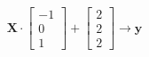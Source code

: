 \documentclass[10pt]{article}
\begin{document}
\begin{align*}\boldsymbol{X} \cdot
\begin{bmatrix}
-1 \\
0 \\
1
\end{bmatrix}
+
\begin{bmatrix}
2 \\
2 \\
2
\end{bmatrix}
\rightarrow
\boldsymbol{y}\end{align*}
\end{document}

